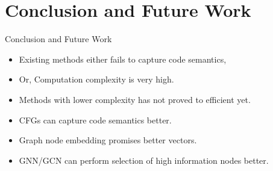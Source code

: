 \section{Conclusion and Future Work}
\begin{frame}{Conclusion and Future Work}

\begin{itemize}
    \item Existing methods either fails to capture code semantics,
    \item Or, Computation complexity is very high.
    \item Methods with lower complexity has not proved to efficient yet.
    \item CFGs can capture code semantics better.
    \item Graph node embedding promises better vectors.
    \item GNN/GCN can perform selection of high information nodes better.
\end{itemize}

\end{frame}